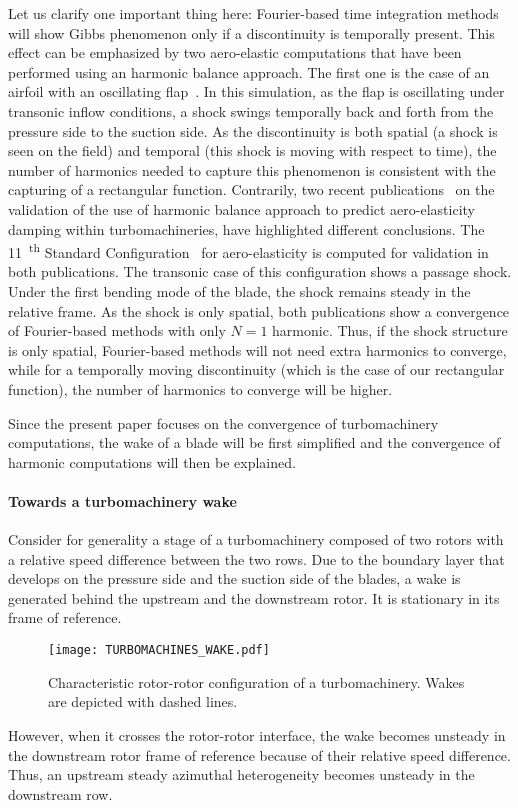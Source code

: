 Let us clarify one important thing here: Fourier-based time integration methods
will show Gibbs phenomenon only if a discontinuity is temporally
present.
This effect can be emphasized by two 
aero-elastic computations that have been performed 
using an harmonic
balance approach. The first one is the case of 
an airfoil with an oscillating 
flap~\cite{Dufour2010}. In this simulation, as the flap is oscillating
under transonic inflow conditions, a shock swings temporally
back and forth from the pressure side to the
suction side. As the discontinuity is
both spatial (a shock is seen on the field) and temporal
(this shock is moving with respect to time), the number
of harmonics needed to capture this phenomenon is
consistent with the capturing of a rectangular function.
Contrarily, two recent publications~\cite{Huang2013144,Sicot:2012uq} on the validation
of the use of harmonic balance approach to predict
aero-elasticity damping within turbomachineries, have highlighted
different conclusions. The 11~\textsuperscript{th}
Standard Configuration~\cite{Fransson:1999uq} for aero-elasticity is computed
for validation in both publications. The transonic case
of this configuration shows a passage shock. Under the first bending mode
of the blade, the shock remains steady in the relative frame. As the shock
is only spatial, both publications show a convergence of 
Fourier-based methods with only $N=1$ harmonic. Thus, if the shock
structure is only spatial, Fourier-based methods will not need
extra harmonics to converge, while for a temporally moving discontinuity
(which is the case of our rectangular function), the number
of harmonics to converge will be higher.

Since the present paper focuses on the convergence of turbomachinery
computations, the wake of a blade will be first
simplified and the convergence of harmonic computations will then be
explained.

\paragraph{Towards a turbomachinery wake}
\label{sec:turbomachine_wake}

Consider for generality a stage of a turbomachinery composed of two rotors
with a relative speed difference between the two rows.
Due to the boundary layer that develops on 
the pressure side and the suction side of the blades, a wake is generated behind
the upstream and the downstream rotor. It is stationary in its frame of reference.
\begin{figure}[htb]
    \centering\texttt{[image: TURBOMACHINES\_WAKE.pdf]}
  \caption{Characteristic rotor-rotor configuration of a turbomachinery. 
  Wakes are depicted with dashed lines.}
  \label{fig:rotor-stator}
\end{figure}
However, when it crosses the rotor-rotor interface,
the wake becomes unsteady in the downstream rotor frame of reference
because of their relative speed difference. Thus, 
an upstream steady azimuthal heterogeneity becomes unsteady in
the downstream row.

